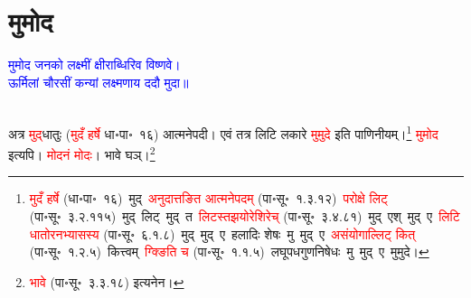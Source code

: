 \section[मुमोद]{मुमोद}
\centering\textcolor{blue}{मुमोद जनको लक्ष्मीं क्षीराब्धिरिव विष्णवे।\nopagebreak\\
ऊर्मिलां चौरसीं कन्यां लक्ष्मणाय ददौ मुदा॥}\nopagebreak\\
\\
\fontsize{14}{21}\selectfont\begin{sloppypar}\justifying\noindent\hspace{10mm} अत्र \textcolor{red}{मुद्‌}\-धातुः (\textcolor{red}{मुदँ हर्षे} धा॰पा॰~१६) आत्मनेपदी। एवं तत्र लिटि लकारे \textcolor{red}{मुमुदे} इति पाणिनीयम्।\footnote{\textcolor{red}{मुदँ हर्षे} (धा॰पा॰~१६)~\arrow मुद्~\arrow \textcolor{red}{अनुदात्तङित आत्मने\-पदम्} (पा॰सू॰~१.३.१२)~\arrow \textcolor{red}{परोक्षे लिट्} (पा॰सू॰~३.२.११५)~\arrow मुद्~लिट्~\arrow मुद्~त~\arrow \textcolor{red}{लिटस्तझयोरेशिरेच्} (पा॰सू॰~३.४.८१)~\arrow मुद्~एश्~\arrow मुद्~ए~\arrow \textcolor{red}{लिटि धातोरनभ्यासस्य} (पा॰सू॰~६.१.८)~\arrow मुद्~मुद्~ए~\arrow हलादिः शेषः~\arrow मु~मुद्~ए~\arrow \textcolor{red}{असंयोगाल्लिट् कित्} (पा॰सू॰~१.२.५)~\arrow कित्त्वम्~\arrow \textcolor{red}{ग्क्ङिति च} (पा॰सू॰~१.१.५)~\arrow लघूपध\-गुणनिषेधः~\arrow मु~मुद्~ए~\arrow मुमुदे।} \textcolor{red}{मुमोद} इत्यपि। \textcolor{red}{मोदनं मोदः}। भावे घञ्।\footnote{\textcolor{red}{भावे} (पा॰सू॰~३.३.१८) इत्यनेन।}

\end{sloppypar}
